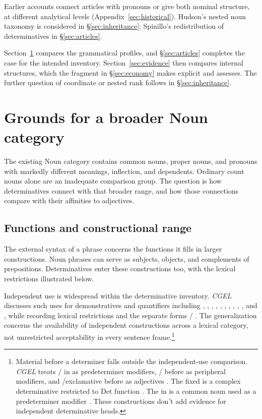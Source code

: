 \documentclass[12pt]{article}
\begin{document}
Earlier accounts connect articles with pronouns or give both nominal structure, at different analytical levels (Appendix~\ref{sec:historical}). Hudson's nested noun taxonomy is considered in §\ref{sec:inheritance}; Spinillo's redistribution of determinatives in §\ref{sec:articles}.

Section~\ref{sec:proposal} compares the grammatical profiles, and §\ref{sec:articles} completes the case for the intended inventory. Section~\ref{sec:evidence} then compares internal structures, which the fragment in §\ref{sec:economy} makes explicit and assesses. The further question of coordinate or nested rank follows in §\ref{sec:inheritance}.

\section{Grounds for a broader Noun category}\label{sec:proposal}

The existing Noun category contains common nouns, proper nouns, and pronouns with markedly different meanings, inflection, and dependents. Ordinary count nouns alone are an inadequate comparison group. The question is how determinatives connect with that broader range, and how those connections compare with their affinities to adjectives.

\subsection{Functions and constructional range}\label{sec:independent}

The external syntax of a phrase concerns the functions it fills in larger constructions. Noun phrases can serve as subjects, objects, and complements of prepositions. Determinatives enter these constructions too, with the lexical restrictions illustrated below.

Independent use is widespread within the determinative inventory. \textit{CGEL} discusses such uses for demonstratives and quantifiers including , , , , , , , , , , and , while recording lexical restrictions and the separate forms / \citep[371--372, 410--424]{huddleston2002}. The generalization concerns the availability of independent constructions across a lexical category, not unrestricted acceptability in every sentence frame.\footnote{Material before a determiner falls outside the independent-use comparison. \textit{CGEL} treats / in  as predeterminer modifiers, / before  as peripheral modifiers, and /exclamative  before  as adjectives \citep[433--437]{huddleston2002}. The fixed  is a complex determinative restricted to Det function \citep[394]{huddleston2002}. The  in  is a common noun used as a predeterminer modifier \citep[434]{huddleston2002}. These constructions don't add evidence for independent determinative heads.}
\end{document}
